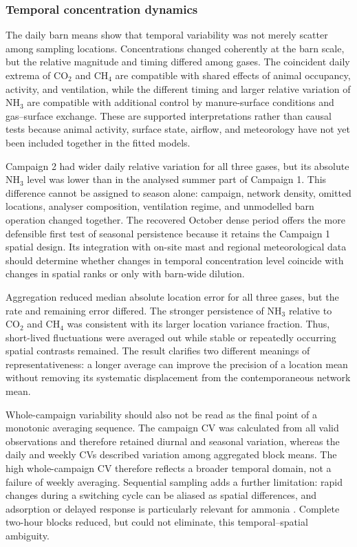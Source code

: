 \documentclass[12pt,a4paper]{article}
\begin{document}
\subsubsection{Temporal concentration dynamics}

The daily barn means show that temporal variability was not merely scatter
among sampling locations. Concentrations changed coherently at the barn scale,
but the relative magnitude and timing differed among gases. The coincident
daily extrema of \(\mathrm{CO_2}\) and \(\mathrm{CH_4}\) are compatible
with shared effects of animal occupancy, activity, and ventilation, while the
different timing and larger relative variation of \(\mathrm{NH_3}\) are
compatible with additional control by manure-surface conditions and
gas--surface exchange. These are supported interpretations rather than causal
tests because animal activity, surface state, airflow, and meteorology have not
yet been included together in the fitted models.

Campaign 2 had wider daily relative variation for all three gases, but its
absolute \(\mathrm{NH_3}\) level was lower than in the analysed summer part
of Campaign 1. This difference cannot be assigned to season alone: campaign,
network density, omitted locations, analyser composition, ventilation regime,
and unmodelled barn operation changed together. The recovered October dense
period offers the more defensible first test of seasonal persistence because
it retains the Campaign 1 spatial design. Its integration with on-site mast
and regional meteorological data should determine whether changes in temporal
concentration level coincide with changes in spatial ranks or only with
barn-wide dilution.

Aggregation reduced median absolute location error for all three gases, but
the rate and remaining error differed. The stronger persistence of
\(\mathrm{NH_3}\) relative to \(\mathrm{CO_2}\) and
\(\mathrm{CH_4}\) was consistent with its larger location variance fraction.
Thus, short-lived fluctuations were averaged out while stable or repeatedly
occurring spatial contrasts remained. The result clarifies two different
meanings of representativeness: a longer average can improve the precision of
a location mean without removing its systematic displacement from the
contemporaneous network mean.

Whole-campaign variability should also not be read as the final point of a
monotonic averaging sequence. The campaign CV was calculated from all valid
observations and therefore retained diurnal and seasonal variation, whereas
the daily and weekly CVs described variation among aggregated block means.
The high whole-campaign CV therefore reflects a broader temporal domain, not a
failure of weekly averaging. Sequential sampling adds a further limitation:
rapid changes during a switching cycle can be aliased as spatial differences,
and adsorption or delayed response is particularly relevant for ammonia
\citep{Rom2010}. Complete two-hour blocks reduced, but could not eliminate,
this temporal--spatial ambiguity.
\end{document}

